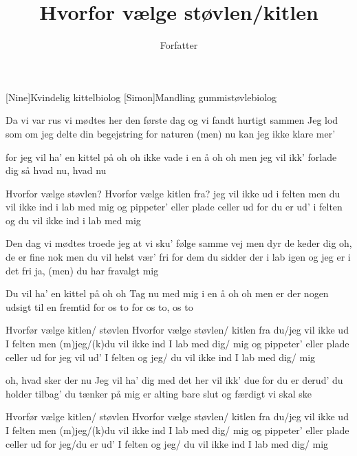 \documentclass[a4paper,11pt]{article}
\title{Hvorfor vælge støvlen/kitlen}
\author{Forfatter}
\begin{document}
\maketitle

\begin{roles}
[Nine]Kvindelig kittelbiolog
[Simon]Mandling gummistøvlebiolog
\end{roles}

\begin{song}
	 Da vi var rus
        vi mødtes her
        den første dag
	og vi fandt hurtigt sammen
	Jeg lod som om jeg delte din
	begejstring for naturen
	(men) nu kan jeg  ikke klare mer’

	for jeg vil ha’ en kittel på oh oh
	ikke vade i en å oh oh
	men jeg vil ikk’ forlade dig
	så hvad nu, hvad nu

	Hvorfor vælge støvlen?
	Hvorfor vælge kitlen fra?
        jeg vil ikke ud i felten men du
	vil ikke ind i lab med mig
        og pippeter’
	eller plade celler ud for du er
        ud’ i felten og du
	vil ikke ind i lab med mig

	 Den dag vi mødtes troede jeg
	at vi sku’ følge samme vej
        men dyr de keder dig
         oh, de er fine nok
	 men du vil helst vær’ fri for dem
	du sidder der i lab igen
	og jeg er i det fri
	 ja, (men) du har fravalgt mig

	Du vil ha’ en kittel på oh oh
	Tag nu med mig i en å oh oh
	 men er der nogen udsigt til
        en fremtid for os to
	for os to, os to

	 Hvorfør vælge kitlen/ støvlen
	Hvorfor vælge  støvlen/ kitlen fra
	du/jeg vil ikke ud I felten men (m)jeg/(k)du
	vil ikke ind I lab med  dig/ mig
         og pippeter’
	eller plade celler ud for jeg vil
         ud’ I felten og  jeg/ du
	vil ikke ind I lab med  dig/ mig

	 oh, hvad sker der nu
         Jeg vil ha’ dig med
	 det her vil ikk’ due
	for du er derud’
	 du holder tilbag’
	 du tænker på mig
	 er alting bare slut og færdigt
         vi skal ske

	 Hvorfør vælge kitlen/ støvlen
	Hvorfor vælge  støvlen/ kitlen fra
 	du/jeg vil ikke ud I felten men (m)jeg/(k)du
	vil ikke ind I lab med  dig/ mig
        og pippeter’
	eller plade celler ud for jeg/du er
        ud’ I felten og  jeg/ du
	vil ikke ind I lab med  dig/ mig


\end{song}
\end{document}
